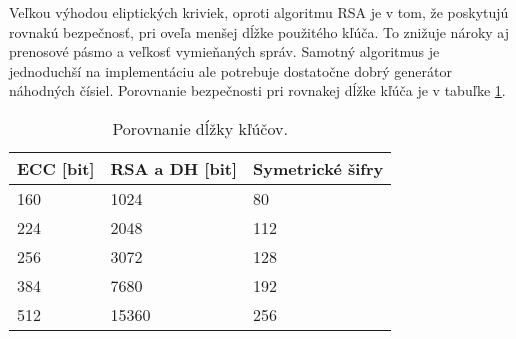 \documentclass[12pt,a4paper,oneside,openright]{report}
\begin{document}
Veľkou výhodou eliptických kriviek, oproti algoritmu RSA je v tom, že poskytujú rovnakú bezpečnosť, pri oveľa menšej dĺžke použitého kľúča. To znižuje nároky aj prenosové pásmo a veľkosť vymieňaných správ. Samotný algoritmus je jednoduchší na implementáciu ale potrebuje dostatočne dobrý generátor náhodných čísiel. Porovnanie bezpečnosti pri rovnakej dĺžke kľúča je v tabuľke \ref{table:PorovnanieDlzkyKlucov}. 


\begin{table}
	\centering
	\caption{Porovnanie dĺžky kľúčov\cite{ecclesson}.} 
	\label{table:PorovnanieDlzkyKlucov}
	\begin{tabular}{|l|l|l|}
		\hline
		\textbf{ECC} [bit] & \textbf{RSA a DH} [bit] & \textbf{Symetrické šifry} \\
		\hline
				\hline
		160 & 1024 & 80 \\
		\hline
		224 & 2048 & 112 \\
		\hline
		256 & 3072 & 128 \\
		\hline
		384 & 7680 & 192 \\
		\hline
		512 & 15360 & 256 \\
		\hline
	\end{tabular}
\end{table}

\end{document}
